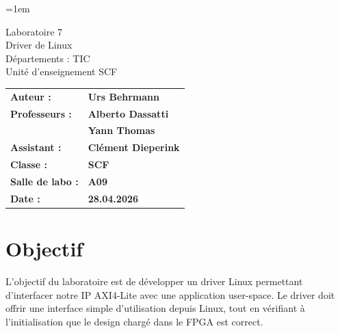 \documentclass[a4paper,12pt]{article}
\author{Urs Behrmann}
\begin{document}
\emergencystretch=1em %

\thispagestyle{firstpage}


\vspace*{2cm}
\begin{center}
    \Huge Laboratoire 7 \\
    \vspace{0.2cm}
    \Large Driver de Linux\\
    \vspace{1cm}
    \small Départements : TIC\\
    Unité d'enseignement SCF\\
\end{center}

\vspace{9cm}

\renewcommand{\arraystretch}{1.5} %

\begin{flushleft} %
    \begin{tabular}{@{}l l@{}}
        \textbf{Auteur :}        & \textbf{Urs Behrmann} \\
        \textbf{Professeurs :}   & \textbf{Alberto Dassatti} \\
                                 & \textbf{Yann Thomas} \\
        \textbf{Assistant :}     & \textbf{Clément Dieperink} \\
        \textbf{Classe :}        & \textbf{SCF} \\
        \textbf{Salle de labo :} & \textbf{A09} \\
        \textbf{Date :}          & \textbf{28.04.2026} \\
    \end{tabular}
\end{flushleft}

\newpage

\pagestyle{otherpages}

\tableofcontents

\newpage

\section{Objectif}
L'objectif du laboratoire est de développer un driver Linux permettant d'interfacer
notre IP AXI4-Lite avec une application user-space.
Le driver doit offrir une interface simple d'utilisation depuis Linux, tout en
vérifiant à l'initialisation que le design chargé dans le FPGA est correct.
\end{document}
